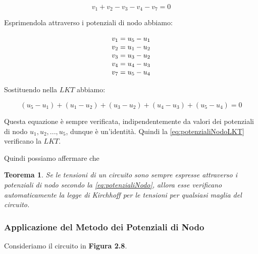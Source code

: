 \documentclass[a4paper]{report}
\newtheorem{definizione}{Teorema}
\begin{document}
\[
v_1+v_2-v_3-v_4-v_7=0
\]

Esprimendola attraverso i potenziali di nodo abbiamo:

\begin{equation}\label{eq:potenzialiNodoLKT}
  \begin{array}{l l l l l}
    v_1=u_5-u_1\\
    v_2=u_1-u_2\\
    v_3=u_3-u_2\\
    v_4=u_4-u_3\\
    v_7=u_5-u_4
  \end{array}
\end{equation}

Sostituendo nella $LKT$ abbiamo:

\[
(u_5-u_1)+(u_1-u_2)+(u_3-u_2)+(u_4-u_3)+(u_5-u_4)=0
\]

Questa equazione \`e sempre verificata, indipendentemente da valori
dei potenziali di nodo $u_1, u_2,..., u_5$, dunque \`e
un'identit\`a. Quindi la \ref{eq:potenzialiNodoLKT} verificano la $LKT$.

Quindi possiamo affermare che

\begin{definizione}
  Se le tensioni di un circuito sono sempre espresse attraverso i
  potenziali di nodo secondo la \ref{eq:potenzialiNodo}, allora esse
  verificano automaticamente la legge di Kirchhoff per le tensioni per
  qualsiasi maglia del circuito.
\end{definizione}

\subsubsection{Applicazione del Metodo dei Potenziali di Nodo}

Consideriamo il circuito in {\bf Figura 2.8}.
\end{document}
